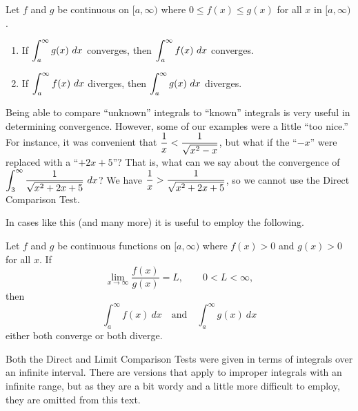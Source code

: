 {Let $f$ and $g$ be continuous on $[a,\infty)$ where $0\leq f(x)\leq g(x)$ for all $x$ in $[a,\infty)$. 
	\begin{enumerate}[1)]
	\item		If $\ds \int_a^\infty g(x)\ dx$ converges, then $\ds \int_a^\infty f(x)\ dx$ converges.
	\item		If $\ds \int_a^\infty f(x)\ dx$ diverges, then $\ds \int_a^\infty g(x)\ dx$ diverges.
	\end{enumerate}
} %


Being able to compare ``unknown'' integrals to ``known'' integrals is very useful in determining convergence. However, some of our examples were a little ``too nice.'' For instance, it was convenient that $\displaystyle \frac{1}x < \frac{1}{\sqrt{x^2-x}}$, but what if the ``$-x$'' were replaced with a ``$+2x+5$''? That is, what can we say about the convergence of $\ds \int_3^\infty\frac{1}{\sqrt{x^2+2x+5}}\ dx$? We have $\displaystyle \frac{1}{x} > \frac1{\sqrt{x^2+2x+5}}$, so we cannot use the Direct Comparison Test.

In cases like this (and many more) it is useful to employ the following.

{Let $f$ and $g$ be continuous functions on $[a,\infty)$ where $f(x)>0$ and $g(x)>0$ for all $x$. If $$\lim_{x\to\infty} \frac{f(x)}{g(x)} = L,\qquad 0<L<\infty,$$
	then $$\int_a^\infty f(x)\ dx \quad \text{and} \quad \int_a^\infty g(x)\ dx$$ 
either both converge or both diverge.%
} %


Both the Direct and Limit Comparison Tests were given in terms of integrals over an infinite interval. There are versions that apply to improper integrals with an infinite range, but as they are a bit wordy and a little more difficult to employ, they are omitted from this text.


